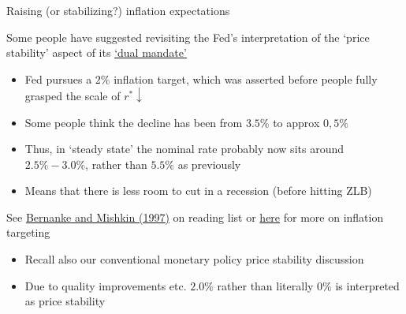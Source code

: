 \begin{frame}{Raising (or stabilizing?) inflation expectations}

Some people have suggested revisiting the Fed's interpretation of the `price stability' aspect of its \href{https://www.chicagofed.org/research/dual-mandate/dual-mandate}{`dual mandate'}
\begin{itemize}
\item	Fed pursues a $2\%$ inflation target, which was asserted before people fully grasped the scale of $r^{\ast}\downarrow$
\item	Some people think the decline has been from $3.5\%$ to approx $0,5\%$
\item	Thus, in `steady state' the nominal rate probably now sits around $2.5\%-3.0\%$, rather than $5.5\%$ as previously
\item	Means that there is less room to cut in a recession (before hitting ZLB)
\end{itemize}

\vspace{2mm}
See \href{https://www.jstor.org/stable/2138238}{Bernanke and Mishkin (1997)} on reading list or \href{https://www.imf.org/external/pubs/ft/fandd/basics/target.htm}{here} for more on inflation targeting
\begin{itemize}
\item	Recall also our conventional monetary policy price stability discussion
\item	Due to quality improvements etc. $2.0\%$ rather than literally $0\%$ is interpreted as price stability
\end{itemize}

\end{frame}


	
